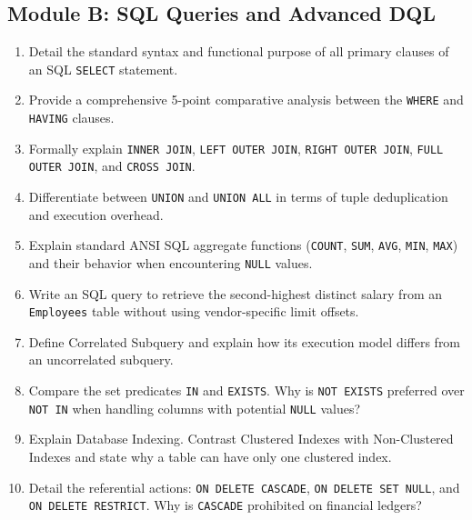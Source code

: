 \subsection{Module B: SQL Queries and Advanced DQL}
\begin{enumerate}[resume]
    \item Detail the standard syntax and functional purpose of all primary clauses of an SQL \texttt{SELECT} statement.
    \item Provide a comprehensive 5-point comparative analysis between the \texttt{WHERE} and \texttt{HAVING} clauses.
    \item Formally explain \texttt{INNER JOIN}, \texttt{LEFT OUTER JOIN}, \texttt{RIGHT OUTER JOIN}, \texttt{FULL OUTER JOIN}, and \texttt{CROSS JOIN}.
    \item Differentiate between \texttt{UNION} and \texttt{UNION ALL} in terms of tuple deduplication and execution overhead.
    \item Explain standard ANSI SQL aggregate functions (\texttt{COUNT}, \texttt{SUM}, \texttt{AVG}, \texttt{MIN}, \texttt{MAX}) and their behavior when encountering \texttt{NULL} values.
    \item Write an SQL query to retrieve the second-highest distinct salary from an \texttt{Employees} table without using vendor-specific limit offsets.
    \item Define Correlated Subquery and explain how its execution model differs from an uncorrelated subquery.
    \item Compare the set predicates \texttt{IN} and \texttt{EXISTS}. Why is \texttt{NOT EXISTS} preferred over \texttt{NOT IN} when handling columns with potential \texttt{NULL} values?
    \item Explain Database Indexing. Contrast Clustered Indexes with Non-Clustered Indexes and state why a table can have only one clustered index.
    \item Detail the referential actions: \texttt{ON DELETE CASCADE}, \texttt{ON DELETE SET NULL}, and \texttt{ON DELETE RESTRICT}. Why is \texttt{CASCADE} prohibited on financial ledgers?
\end{enumerate}

